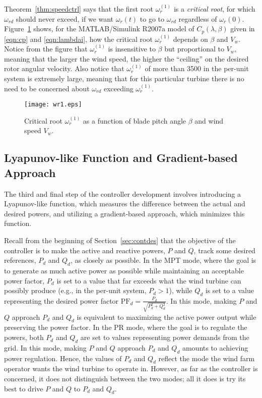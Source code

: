 \documentclass[journal]{IEEEtran}
\begin{document}
Theorem~\ref{thm:speedctrl} says that the first root $\omega_r^{(1)}$ is a {\em critical root}, for which $\omega_{rd}$ should never exceed, if we want $\omega_r(t)$ to go to $\omega_{rd}$ regardless of $\omega_r(0)$. Figure~\ref{fig:wr1} shows, for the MATLAB/Simulink R2007a model of $C_p(\lambda,\beta)$ given in \eqref{eqn:cp} and \eqref{eqn:lambdai}, how the critical root $\omega_r^{(1)}$ depends on $\beta$ and $V_w$. Notice from the figure that $\omega_r^{(1)}$ is insensitive to $\beta$ but proportional to $V_w$, meaning that the larger the wind speed, the higher the ``ceiling'' on the desired rotor angular velocity. Also notice that $\omega_r^{(1)}$ of more than 3500 in the per-unit system is extremely large, meaning that for this particular turbine there is no need to be concerned about $\omega_{rd}$ exceeding $\omega_r^{(1)}$.

\begin{figure}[tb]
\centering\texttt{[image: wr1.eps]}
\caption{Critical root $\omega_r^{(1)}$ as a function of blade pitch angle $\beta$ and wind speed $V_w$.}
\label{fig:wr1}
\end{figure}

\subsection{Lyapunov-like Function and Gradient-based Approach}\label{ssec:gradappr}

The third and final step of the controller development involves introducing a Lyapunov-like function, which measures the difference between the actual and desired powers, and utilizing a gradient-based approach, which minimizes this function.

Recall from the beginning of Section~\ref{sec:contdes} that the objective of the controller is to make the active and reactive powers, $P$ and $Q$, track some desired references, $P_d$ and $Q_d$, as closely as possible. In the MPT mode, where the goal is to generate as much active power as possible while maintaining an acceptable power factor, $P_d$ is set to a value that far exceeds what the wind turbine can possibly produce (e.g., in the per-unit system, $P_d>1$), while $Q_d$ is set to a value representing the desired power factor $\text{PF}_d=\frac{P_d}{\sqrt{P_d^2+Q_d^2}}$. In this mode, making $P$ and $Q$ approach $P_d$ and $Q_d$ is equivalent to maximizing the active power output while preserving the power factor. In the PR mode, where the goal is to regulate the powers, both $P_d$ and $Q_d$ are set to values representing power demands from the grid. In this mode, making $P$ and $Q$ approach $P_d$ and $Q_d$ amounts to achieving power regulation. Hence, the values of $P_d$ and $Q_d$ reflect the mode the wind farm operator wants the wind turbine to operate in. However, as far as the controller is concerned, it does not distinguish between the two modes; all it does is try its best to drive $P$ and $Q$ to $P_d$ and $Q_d$.
\end{document}
